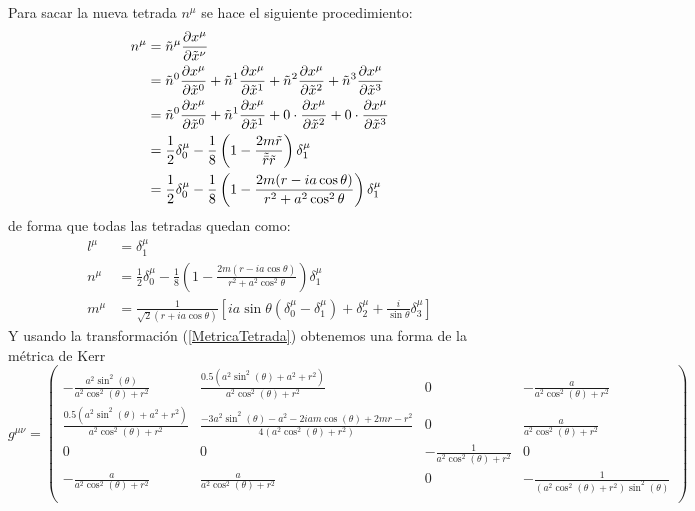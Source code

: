 Para sacar la nueva tetrada $n^\mu$ se hace el siguiente procedimiento:
\begin{equation}
\begin{aligned}
    n^\mu&= \tilde{n}^\mu \frac{\partial x^\mu}{\partial \tilde{x}^\nu} \\
&= \tilde{n}^0 \frac{\partial x^\mu}{\partial \tilde{x}^0} + \tilde{n}^1 \frac{\partial x^\mu}{\partial \tilde{x}^1} + \tilde{n}^2 \frac{\partial x^\mu}{\partial \tilde{x}^2} + \tilde{n}^3 \frac{\partial x^\mu}{\partial \tilde{x}^3} \\
&= \tilde{n}^0 \frac{\partial x^\mu}{\partial \tilde{x}^0} + \tilde{n}^1 \frac{\partial x^\mu}{\partial \tilde{x}^1} +0 \cdot \frac{\partial x^\mu}{\partial \tilde{x}^2} + 0 \cdot \frac{\partial x^\mu}{\partial \tilde{x}^3} \\
& = \frac{1}{2}\delta^{\mu}_0 -\frac{1}{8} \left(1 - \frac{2 m\tilde{r}}{\tilde{\bar{r}}\tilde{r}}\right)\delta_1^\mu \\
& = \frac{1}{2}\delta^{\mu}_0 -\frac{1}{8} \left(1 - \frac{2 m(r-ia\cos\theta)}{r^2+a^2 \cos^2 \theta }\right)\delta_1^\mu \\
\end{aligned}    
\end{equation}
de forma que todas las tetradas quedan como:
\begin{equation}
    \begin{aligned}
        l^\mu & = \delta_1^\mu     \\
        n^\mu & = \frac{1}{2}\delta^{\mu}_0 -\frac{1}{8} \left(1 - \frac{2 m(r-ia\cos\theta)}{r^2+a^2 \cos^2 \theta }\right)\delta_1^\mu  \\
        m^\mu & = \frac{1}{\sqrt{2}(r + ia \cos \theta)} \left[ ia \sin \theta (\delta_0^\mu - \delta_1^\mu) + \delta_2^\mu + \frac{i}{\sin \theta} \delta_3^\mu \right]
    \end{aligned}
\end{equation}
Y usando la transformación (\ref{MetricaTetrada}) obtenemos una forma de la métrica de Kerr
\begin{equation}
   g^{\mu\nu} =  \left(\begin{matrix}
- \frac{a^{2} \sin^{2}{\left(\theta \right)}}{a^{2} \cos^{2}{\left(\theta \right)} + r^{2}} & \frac{0.5 \left(a^{2} \sin^{2}{\left(\theta \right)} + a^{2} + r^{2}\right)}{a^{2} \cos^{2}{\left(\theta \right)} + r^{2}} & 0 & - \frac{a}{a^{2} \cos^{2}{\left(\theta \right)} + r^{2}} \\
\frac{0.5 \left(a^{2} \sin^{2}{\left(\theta \right)} + a^{2} + r^{2}\right)}{a^{2} \cos^{2}{\left(\theta \right)} + r^{2}} & \frac{- 3 a^{2} \sin^{2}{\left(\theta \right)} - a^{2} - 2 i a m \cos{\left(\theta \right)} + 2 m r - r^{2}}{4 \left(a^{2} \cos^{2}{\left(\theta \right)} + r^{2}\right)} & 0 & \frac{a}{a^{2} \cos^{2}{\left(\theta \right)} + r^{2}} \\
0 & 0 & - \frac{1}{a^{2} \cos^{2}{\left(\theta \right)} + r^{2}} & 0 \\
- \frac{a}{a^{2} \cos^{2}{\left(\theta \right)} + r^{2}} & \frac{a}{a^{2} \cos^{2}{\left(\theta \right)} + r^{2}} & 0 & - \frac{1}{\left(a^{2} \cos^{2}{\left(\theta \right)} + r^{2}\right) \sin^{2}{\left(\theta \right)}} \\
\end{matrix}\right)
\end{equation}

